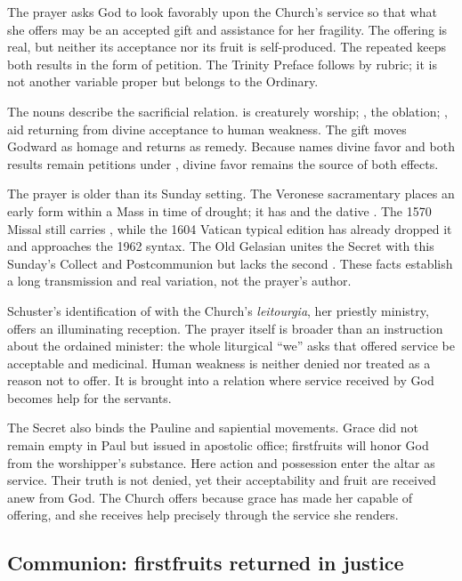 The prayer asks God to look favorably upon the Church's service so that what
she offers may be an accepted gift and assistance for her fragility. The
offering is real, but neither its acceptance nor its fruit is self-produced.
The repeated  keeps both results in the form of petition. The
Trinity Preface follows by rubric; it is not another variable proper but
belongs to the Ordinary.

The nouns describe the sacrificial relation.  is creaturely
worship; , the oblation; , aid returning from
divine acceptance to human weakness. The gift moves Godward as homage and
returns as remedy. Because  names divine favor and both
results remain petitions under , divine favor remains the source
of both effects.

The prayer is older than its Sunday setting. The Veronese sacramentary places
an early form within a Mass in time of drought; it has
 and the dative
. The 1570 Missal still carries , while the 1604
Vatican typical edition has already dropped it and approaches the 1962
syntax. The Old Gelasian unites the Secret with this Sunday's Collect and
Postcommunion but lacks the second . These facts establish a long
transmission and real variation, not the prayer's author.

Schuster's identification of  with the Church's
\emph{leitourgia}, her priestly ministry, offers an illuminating reception.
The prayer itself is broader than an instruction about the ordained minister:
the whole liturgical ``we'' asks that offered service be acceptable and
medicinal. Human weakness is neither denied nor treated as a reason not to
offer. It is brought into a relation where service received by God becomes
help for the servants.

The Secret also binds the Pauline and sapiential movements. Grace did not
remain empty in Paul but issued in apostolic office; firstfruits will honor God
from the worshipper's substance. Here action and possession enter the altar as
service. Their truth is not denied, yet their acceptability and fruit are
received anew from God. The Church offers because grace has made her capable of
offering, and she receives help precisely through the service she renders.

\subsection*{Communion: firstfruits returned in justice\enspace{}}

